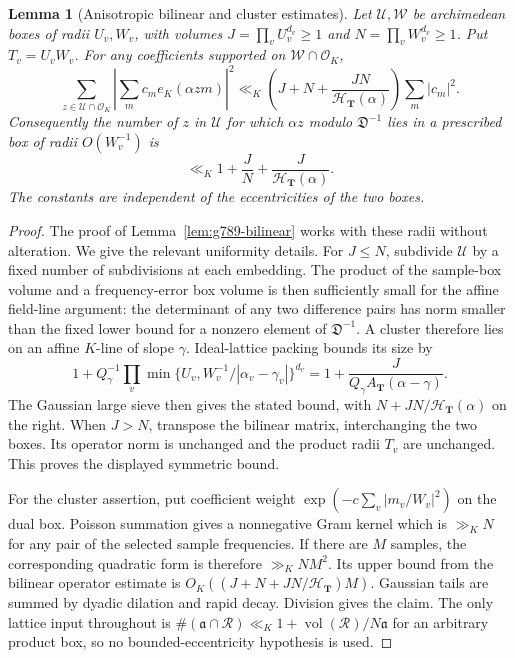 \documentclass[11pt,reqno]{amsart}
\numberwithin{equation}{section}
\newtheorem{lemma}[theorem]{Lemma}
\theoremstyle{definition}
\begin{document}
\begin{lemma}[Anisotropic bilinear and cluster estimates]
\label{lem:anisotropic-bilinear}
Let $\mathcal U,\mathcal W$ be archimedean boxes of radii $U_v,W_v$,
with volumes $J=\prod_vU_v^{d_v}\ge1$ and
$N=\prod_vW_v^{d_v}\ge1$. Put $T_v=U_vW_v$.
For any coefficients supported on $\mathcal W\cap\mathcal O_K$,
\[
 \sum_{z\in\mathcal U\cap\mathcal O_K}
  \left|\sum_m c_m e_K(\alpha zm)\right|^2
 \ll_K \left(J+N+\frac{JN}{\mathcal H_{\mathbf T}(\alpha)}\right)
               \sum_m|c_m|^2.
\]
Consequently the number of $z$ in $\mathcal U$ for which $\alpha z$
modulo $\mathfrak D^{-1}$ lies in a prescribed box of radii $O(W_v^{-1})$
is
\[
 \ll_K 1+\frac JN+\frac J{\mathcal H_{\mathbf T}(\alpha)}.
\]
The constants are independent of the eccentricities of the two boxes.
\end{lemma}
\begin{proof}
The proof of Lemma~\ref{lem:g789-bilinear} works
with these radii without alteration. We give the relevant uniformity details.
For $J\le N$, subdivide $\mathcal U$ by a fixed number of subdivisions
at each embedding. The product of the sample-box volume and a
frequency-error box volume is then sufficiently small for the affine
field-line argument: the determinant of any two difference pairs has
norm smaller than the fixed lower bound for a nonzero element of
$\mathfrak D^{-1}$. A cluster therefore lies on an affine $K$-line of
slope $\gamma$. Ideal-lattice packing bounds its size by
\[
 1+Q_\gamma^{-1}
       \prod_v\min\{U_v,W_v^{-1}/|\alpha_v-\gamma_v|\}^{d_v}
 =1+\frac J{Q_\gamma A_{\mathbf T}(\alpha-\gamma)}.
\]
The Gaussian large sieve then gives the stated bound, with
$N+JN/\mathcal H_{\mathbf T}(\alpha)$ on the right. When $J>N$,
transpose the bilinear matrix, interchanging the two boxes. Its operator
norm is unchanged and the product radii $T_v$ are unchanged. This proves
the displayed symmetric bound.

For the cluster assertion, put coefficient weight
$\exp(-c\sum_v|m_v/W_v|^2)$ on the dual box. Poisson summation gives a
nonnegative Gram kernel which is $\gg_K N$ for any pair of the selected
sample frequencies. If there are $M$ samples, the corresponding quadratic
form is therefore $\gg_K NM^2$. Its upper bound from the bilinear operator
estimate is $O_K((J+N+JN/\mathcal H_{\mathbf T})M)$.
Gaussian tails are summed by dyadic dilation and rapid decay. Division
gives the claim. The only lattice input throughout is
$\#(\mathfrak a\cap\mathcal R)\ll_K1+\operatorname{vol}(\mathcal R)/N\mathfrak a$
for an arbitrary product box, so no bounded-eccentricity hypothesis is used.
\end{proof}
\end{document}
